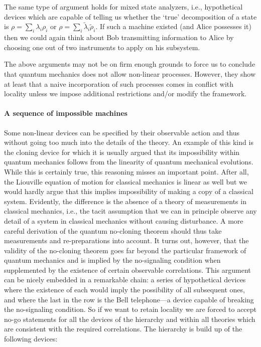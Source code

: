 \documentclass[11pt,a4paper]{article}
\theoremstyle{plain}
\theoremstyle{definition}
\theoremstyle{remark}
\numberwithin{equation}{section}
\begin{document}
The same type of argument holds for mixed state analyzers, i.e., hypothetical devices which are capable of telling us whether the `true' decomposition of a state is $\rho=\sum_i \lambda_i\rho_i$ or $\rho=\sum_i \tilde{\lambda}_i\tilde{\rho}_i$. If such a machine existed (and Alice possesses it) then we could again think about Bob transmitting information to Alice by choosing one out of two instruments to apply on his subsystem.

The above arguments may not be on firm enough grounds to force us to conclude that quantum mechanics does not allow non-linear processes. However, they show at least that a naive incorporation of such processes comes in conflict with locality unless we impose additional restrictions and/or modify the framework.

\paragraph{A sequence of impossible machines}
Some non-linear devices can be specified by their observable action and thus without going too much into the details of the theory. An example of this kind is the cloning device for which it is usually argued that its impossibility within quantum mechanics follows from the linearity of quantum mechanical evolutions. While this is certainly true, this reasoning misses an important point. After all, the Liouville equation of motion for classical mechanics is linear as well but we would hardly argue that this implies impossibility of making a copy of a classical system. Evidently, the difference is the absence of a theory of measurements in classical mechanics, i.e., the tacit assumption that we can in principle observe any detail of a system in classical mechanics without causing disturbance. A more careful derivation of the quantum no-cloning theorem should thus take measurements and re-preparations into account. It turns out, however, that the validity of the no-cloning theorem goes far beyond the particular framework of quantum mechanics and is implied by the no-signaling condition when supplemented by the existence of certain observable correlations. This argument can be nicely embedded in a remarkable chain: a series of hypothetical devices where the existence of each would imply the possibility of all subsequent ones, and where the last in the row is the Bell telephone---a device capable of breaking the no-signaling condition. So if we want to retain locality we are forced to accept no-go statements for all the devices of the hierarchy and within all theories which are consistent with the required correlations. The hierarchy is build up of the following devices:
\end{document}
